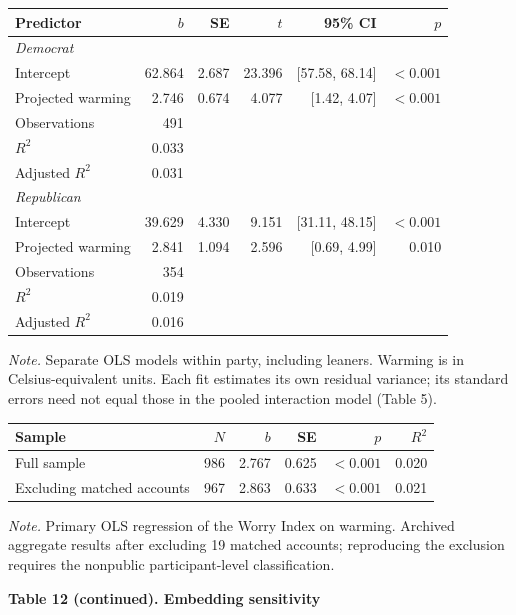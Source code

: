 \documentclass[11pt,a4paper]{article}
\begin{document}
\begin{tabularx}{\textwidth}{@{}Xrrrrr@{}}
\toprule
Predictor & $b$ & SE & $t$ & 95\% CI & $p$ \\
\midrule
\textit{Democrat} &  &  &  &  &  \\
Intercept & 62.864 & 2.687 & 23.396 & [57.58, 68.14] & $<0.001$ \\
Projected warming & 2.746 & 0.674 & 4.077 & [1.42, 4.07] & $<0.001$ \\
Observations & 491 &  &  &  &  \\
$R^2$ & 0.033 &  &  &  &  \\
Adjusted $R^2$ & 0.031 &  &  &  &  \\
\textit{Republican} &  &  &  &  &  \\
Intercept & 39.629 & 4.330 & 9.151 & [31.11, 48.15] & $<0.001$ \\
Projected warming & 2.841 & 1.094 & 2.596 & [0.69, 4.99] & 0.010 \\
Observations & 354 &  &  &  &  \\
$R^2$ & 0.019 &  &  &  &  \\
Adjusted $R^2$ & 0.016 &  &  &  &  \\
\bottomrule\end{tabularx}
\par\smallskip
{\footnotesize\textit{Note.} Separate OLS models within party, including leaners. Warming is in Celsius-equivalent units. Each fit estimates its own residual variance; its standard errors need not equal those in the pooled interaction model (Table 5).\par}
\endgroup\bigskip
\clearpage
{}\label{tab:12}
\begingroup\small
\begin{tabularx}{\textwidth}{@{}Xrrrrr@{}}
\toprule
Sample & $N$ & $b$ & SE & $p$ & $R^2$ \\
\midrule
Full sample & 986 & 2.767 & 0.625 & $<0.001$ & 0.020 \\
Excluding matched accounts & 967 & 2.863 & 0.633 & $<0.001$ & 0.021 \\
\bottomrule\end{tabularx}
\par\smallskip
{\footnotesize\textit{Note.} Primary OLS regression of the Worry Index on warming. Archived aggregate results after excluding 19 matched accounts; reproducing the exclusion requires the nonpublic participant-level classification.\par}
\endgroup\bigskip
\textbf{Table 12 (continued). Embedding sensitivity}\par\smallskip
\end{document}
